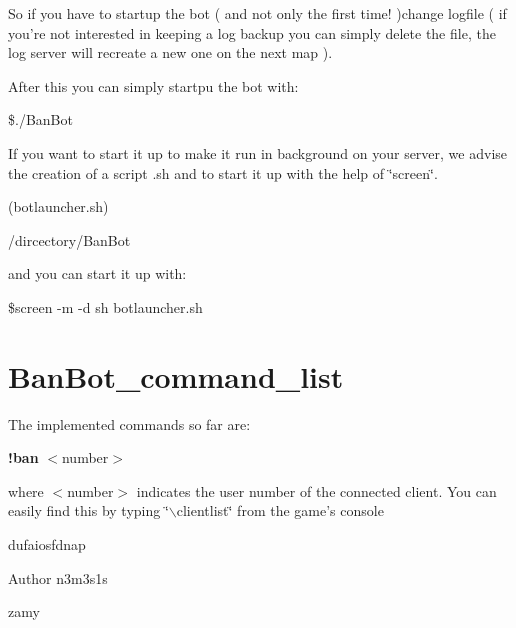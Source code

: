 So if you have to startup the bot ( and not only the first time! )change logfile ( if you're not interested in keeping a log backup you can simply delete the file, the log server will recreate a new one on the next map ).

After this you can simply startpu the bot with: \begin{DoxyItemize}
\item \$./BanBot\end{DoxyItemize}
If you want to start it up to make it run in background on your server, we advise the creation of a script .sh and to start it up with the help of \char`\"{}screen\char`\"{}.

(botlauncher.sh)

/dircectory/BanBot

and you can start it up with:

\begin{DoxyItemize}
\item \$screen -\/m -\/d sh botlauncher.sh\end{DoxyItemize}
\hypertarget{main_BanBot_command_list}{}\section{BanBot\_\-command\_\-list}\label{main_BanBot_command_list}
The implemented commands so far are: \begin{DoxyItemize}
\item {\bfseries !ban} $<$number$>$\end{DoxyItemize}
where $<$number$>$ indicates the user number of the connected client. You can easily find this by typing \char`\"{}$\backslash$clientlist\char`\"{} from the game's console

\begin{DoxyItemize}
\item dufaiosfdnap\end{DoxyItemize}
\begin{DoxyAuthor}{Author}
n3m3s1s 

zamy 
\end{DoxyAuthor}
